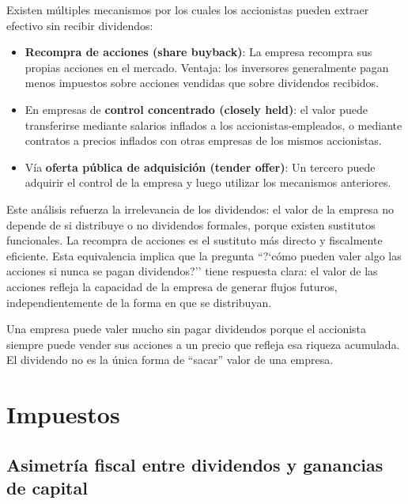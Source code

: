 \documentclass[12pt]{article}
\begin{document}
Existen m\'ultiples mecanismos por los cuales los accionistas pueden extraer efectivo sin recibir dividendos:

\begin{itemize}
  \item \textbf{Recompra de acciones (share buyback)}: La empresa recompra sus propias acciones en el mercado. Ventaja: los inversores generalmente pagan menos impuestos sobre acciones vendidas que sobre dividendos recibidos.
  \item En empresas de \textbf{control concentrado (closely held)}: el valor puede transferirse mediante salarios inflados a los accionistas-empleados, o mediante contratos a precios inflados con otras empresas de los mismos accionistas.
  \item V\'ia \textbf{oferta p\'ublica de adquisici\'on (tender offer)}: Un tercero puede adquirir el control de la empresa y luego utilizar los mecanismos anteriores.
\end{itemize}

\begin{explicacion}
Este an\'alisis refuerza la irrelevancia de los dividendos: el valor de la empresa no depende de si distribuye o no dividendos formales, porque existen sustitutos funcionales. La recompra de acciones es el sustituto m\'as directo y fiscalmente eficiente. Esta equivalencia implica que la pregunta ``?`c\'omo pueden valer algo las acciones si nunca se pagan dividendos?'' tiene respuesta clara: el valor de las acciones refleja la capacidad de la empresa de generar flujos futuros, independientemente de la forma en que se distribuyan.
\end{explicacion}

\begin{intuicion}
Una empresa puede valer mucho sin pagar dividendos porque el accionista siempre puede vender sus acciones a un precio que refleja esa riqueza acumulada. El dividendo no es la \'unica forma de ``sacar'' valor de una empresa.
\end{intuicion}

\section{Impuestos}

\subsection{Asimetr\'ia fiscal entre dividendos y ganancias de capital}
\end{document}
